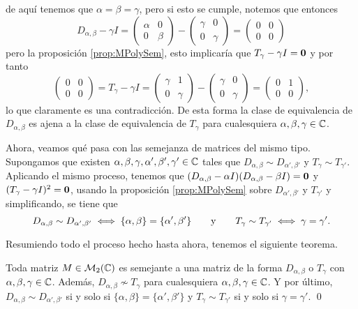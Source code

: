 de aquí tenemos que $\alpha = \beta = \gamma$, pero si esto se cumple, notemos que entonces
\[
  D_{\alpha,\beta} - \gamma I = \begin{pmatrix} \alpha & 0 \\ 0 & \beta \end{pmatrix} - \begin{pmatrix} \gamma & 0 \\ 0 & \gamma \end{pmatrix}
  = \begin{pmatrix} 0 & 0 \\ 0 & 0 \end{pmatrix}
\]
pero la proposición \ref{prop:MPolySem}, esto implicaría que $T_\gamma - \gamma I  = \mathbf{0}$ y por tanto
\[
  \begin{pmatrix} 0 & 0 \\ 0 & 0 \end{pmatrix} = T_\gamma - \gamma I = \begin{pmatrix} \gamma & 1 \\ 0 & \gamma \end{pmatrix} - \begin{pmatrix} \gamma & 0 \\ 0 & \gamma \end{pmatrix} = \begin{pmatrix}
    0 & 1 \\ 0 & 0 \end{pmatrix},
\]
lo que claramente es una contradicción. De esta forma la clase de equivalencia de $D_{\alpha,\beta}$ es ajena a la clase de equivalencia de $T_\gamma$ para cualesquiera $\alpha,\beta,\gamma \in \mathbb{C}$.

Ahora, veamos qué pasa con las semejanza de matrices del mismo tipo. Supongamos que existen $\alpha, \beta, \gamma, \alpha', \beta', \gamma' \in \mathbb{C}$ tales que $D_{\alpha,\beta} \sim D_{\alpha',\beta'}$ y $T_\gamma \sim T_{\gamma'}$. Aplicando el mismo proceso, tenemos que $(D_{\alpha,\beta} - \alpha I)(D_{\alpha,\beta} - \beta I) = \mathbf{0}$ y $(T_\gamma - \gamma I)^2 = \mathbf{0}$, usando la proposición \ref{prop:MPolySem} sobre $D_{\alpha',\beta'}$ y $T_{\gamma'}$ y simplificando, se tiene que 
\[
  D_{\alpha,\beta} \sim D_{\alpha',\beta'} \iff \{\alpha,\beta\} = \{\alpha',\beta'\}
    \qquad\text{y}\qquad
  T_\gamma \sim T_{\gamma'} \iff \gamma = \gamma'.
\]

Resumiendo todo el proceso hecho hasta ahora, tenemos el siguiente teorema.
\begin{teor} \label{teor:TDMat2x2}
  Toda matriz $M \in \mathcal{M}_2(\mathbb{C})$ es semejante a una matriz de la forma $D_{\alpha,\beta}$ o $T_\gamma$ con $\alpha, \beta, \gamma \in \mathbb{C}$. Además, $D_{\alpha,\beta} \nsim T_\gamma$ para cualesquiera $\alpha,\beta,\gamma \in \mathbb{C}$. Y por último, $D_{\alpha,\beta} \sim D_{\alpha',\beta'}$ si y solo si $\{\alpha,\beta\} = \{\alpha',\beta'\}$ y $T_\gamma \sim T_{\gamma'}$ si y solo si $\gamma = \gamma'$. \qed
\end{teor}

